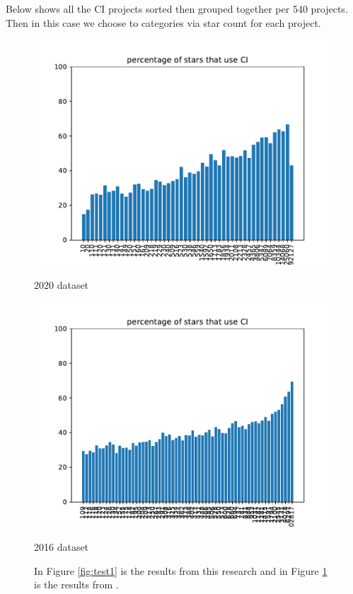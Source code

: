 \documentclass[twoside,12pt,titlepage,a4paper]{article}
\begin{document}
Below shows all the CI projects sorted then grouped together per 540 projects. Then in this case we choose to categories via star count for each project. 

\begin{figure}[!htbp]
  \centering
  \begin{minipage}{.48\textwidth}
    \centering
    \includegraphics[width=.9\textwidth]{../src/results/percentage stars with CI.pdf}
    \caption{2020 dataset}
    \label{fig:test1}
  \end{minipage}%
  \hfill
  \begin{minipage}{.48\textwidth}
    \centering
    \includegraphics[width=.9\textwidth]{../src/results/percentage sub with CI other paper source.pdf}
    \caption[]{2016 dataset}
    \label{fig:test2}
  \end{minipage}
  \caption{In Figure \ref{fig:test1} is the results from this research and in Figure \ref{fig:test2} is the results from \cite{Hilton2016}.
  }
\end{figure}
  
\end{document}

